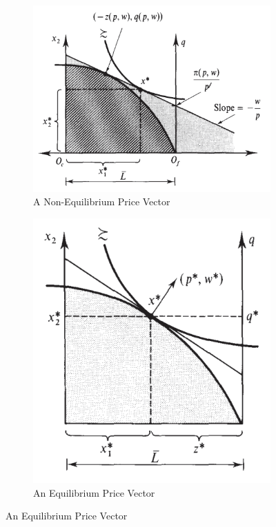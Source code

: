 \documentclass{report}
\begin{document}
			\begin{figure}[h]
				\centering
				\begin{subfigure}{.45\textwidth}
					\centering
					\includegraphics[width=\linewidth]{figures/1C1P_not_eq}
					\caption{A Non-Equilibrium Price Vector}
				\end{subfigure}
				\begin{subfigure}{.45\textwidth}
					\centering
					\includegraphics[width=0.75\linewidth]{figures/1C1P_eq}
					\caption{An Equilibrium Price Vector}
				\end{subfigure}
			\end{figure}
			
\end{document}
